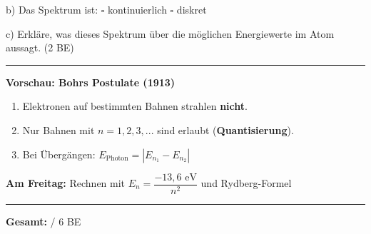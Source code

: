 \documentclass[11pt,a4paper]{article}
\begin{document}
\vspace{0.5em}

\begin{center}
\end{center}

\vspace{0.5em}

b) Das Spektrum ist: \hspace{0.5cm} $\square$ kontinuierlich \hspace{1cm} $\square$ diskret

\vspace{0.5em}

c) Erkläre, was dieses Spektrum über die möglichen Energiewerte im Atom aussagt. (2 BE)

\vspace{3.5cm}

\hrule
\vspace{0.8em}


\begin{tcolorbox}[infobox]
\textbf{Vorschau: Bohrs Postulate (1913)}

\vspace{0.3em}

\begin{enumerate}[noitemsep,topsep=0pt]
\item Elektronen auf bestimmten Bahnen strahlen \textbf{nicht}.
\item Nur Bahnen mit $n = 1, 2, 3, ...$ sind erlaubt (\textbf{Quantisierung}).
\item Bei Übergängen: $E_{\text{Photon}} = |E_{n_1} - E_{n_2}|$
\end{enumerate}

\vspace{0.3em}

\textbf{Am Freitag:} Rechnen mit $E_n = \dfrac{-13{,}6 \text{ eV}}{n^2}$ und Rydberg-Formel
\end{tcolorbox}

\vfill

\begin{center}
\rule{10cm}{0.5pt}

\textbf{Gesamt:} \underline{\hspace{1cm}} / 6 BE
\end{center}
\end{document}
